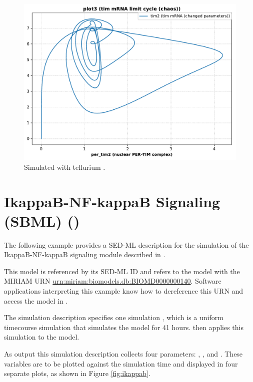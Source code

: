 \begin{figure}[ht]
\begin{minipage}{0.47\textwidth}
		\includegraphics[width=1.0\textwidth]{examples/leloup-sbml/results/tellurium/plot3}
        \caption{Simulated with tellurium \citep{tellurium}.}
    \end{minipage}
    \label{fig:leloup-sbml}
\end{figure}



\section{IkappaB-NF-kappaB Signaling (SBML) ()}
The following example provides a SED-ML description for the simulation of the IkappaB-NF-kappaB signaling module described in \citep{hoffmann2002ikappab}.

This model is referenced by its SED-ML ID  and refers to the model with the MIRIAM URN \url{urn:miriam:biomodels.db:BIOMD0000000140}. 
Software applications interpreting this example know how to dereference this URN and access the model in \biom \citep{N+06}.

The simulation description specifies one simulation , which is a uniform timecourse simulation that simulates the model for 41 hours.  then applies this simulation to the model.

As output this simulation description collects four parameters: , ,  and . These variables are to be plotted against the simulation time and displayed in four separate plots, as shown in Figure \ref{fig:ikappab}.


